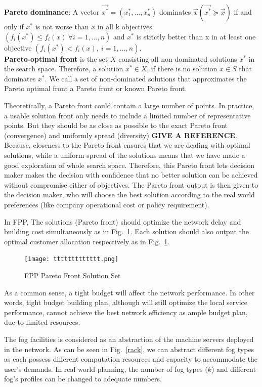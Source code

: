 \documentclass[10pt,journal,compsoc]{IEEEtran}
\newcommand{\Fig}[1]{Fig.~\ref{#1}}
\begin{document}
\textbf{Pareto dominance}: A vector $\vec{x^\ast} = (x_1^\ast, ... ,x_n^\ast)$ dominates $\vec{x} (\vec{x^\ast} \succeq \vec{x})$ if and only if $x^\ast$ is not worse than $x$ in all k objectives $(f_i(x^\ast ) \le f_i(x)\ \forall i = 1,..., n)$ and $x^\ast$ is strictly better than x in at least one objective $(f_i(x^\ast ) < f_i(x),\ i = 1,..., n )$.\\

\textbf{Pareto-optimal front} is the set $X$ consisting all non-dominated solutions $x^\ast$ in the search space. Therefore, a solution $x^\ast \in X $, if there is no solution $x \in S$ that dominates $x^\ast$. We call a set of non-dominated solutions that  approximates the Pareto optimal front a Pareto front or known Pareto front.

Theoretically, a Pareto front could contain a large number of points. In practice, a usable solution front only needs to include a limited number of representative points. But they should be as close as possible to the exact Pareto front (convergence) and uniformly spread (diversity) {\bf{GIVE A REFERENCE}}. Because, closeness to the Pareto front ensures that we are dealing with optimal solutions, while a uniform spread of the solutions means that we have made a good exploration of whole search space. Therefore, this Pareto front lets decision maker makes the decision with confidence that no better solution can be achieved without compromise either of objectives. 
The Pareto front output is then given to the decision maker, who will choose the best solution according to the real world preferences (like company operational cost or policy requirement).

In FPP, The solutions (Pareto front) should optimize the network delay and building cost simultaneously as in \Fig{plan1}. Each solution should also output the optimal customer allocation respectively as in \Fig{plan1}.
\begin{figure}[h]
\centerline{\texttt{[image: ttttttttttttt.png]}}
\caption{FPP Pareto Front Solution Set} 
\label{plan1}
\end{figure}

As a common sense, a tight budget will affect the network performance. In other words, tight budget building plan, although will still optimize the local service performance, cannot achieve the best network efficiency as ample budget plan, due to limited resources. 

The fog facilities is considered as an abstraction of the machine servers deployed in the network. As can be seen in \Fig{rack}, we can abstract different fog types as each possess different computation resources and capacity to accommodate the user's demands. In real world planning, the number of fog types ($k$) and different fog's profiles can be changed to adequate numbers.
\fi
\end{document}
